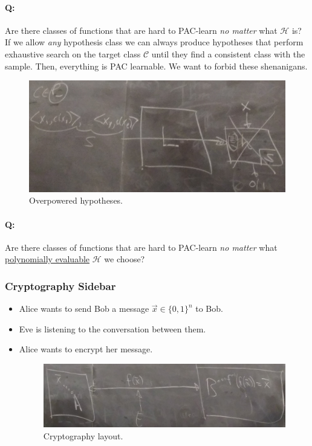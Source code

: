 \documentclass[12pt, letterpaper]{article}
\numberwithin{equation}{section} %
\newcommand{\ul}{\underline}
\newcommand{\mc}{\mathcal}
\theoremstyle{definition}
\theoremstyle{remark}
\begin{document}
\paragraph{Q:}Are there classes of functions that are hard to PAC-learn \emph{no matter} what $\mc H$ is?\\

If we allow \emph{any} hypothesis class we can always produce hypotheses that perform exhaustive search on the target class $\mc C$ until they find a consistent class with the sample. Then, everything is PAC learnable. We want to forbid these shenanigans.
\begin{figure}[H]
\centering
\includegraphics[width=0.6\linewidth]{img/pac.jpg}
\caption{Overpowered hypotheses.}
\end{figure}

\paragraph{Q:}Are there classes of functions that are hard to PAC-learn \emph{no matter} what \ul{polynomially evaluable} $\mc H$ we choose?

\subsubsection{Cryptography Sidebar}
\begin{itemize}
\item Alice wants to send Bob a message $\vec x\in \lbrace 0, 1\rbrace^n$ to Bob.
\item Eve is listening to the conversation between them.
\item Alice wants to encrypt her message.
\begin{figure}[H]
\centering
\includegraphics[width=0.6\linewidth]{img/crypto.jpg}
\caption{Cryptography layout.}
\end{figure}
\end{itemize}
\end{document}
